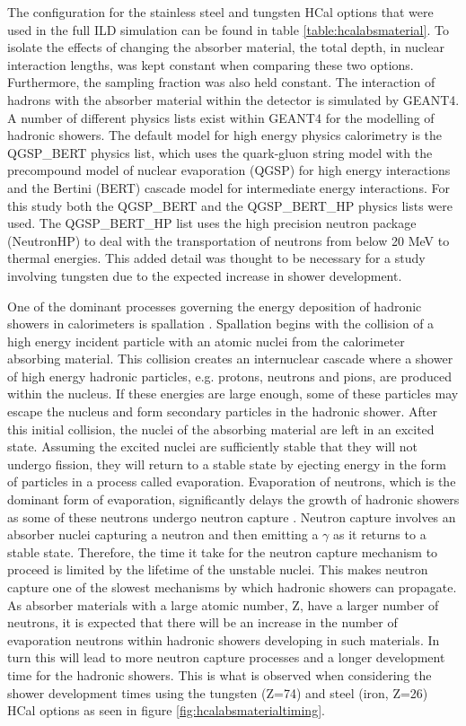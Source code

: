 The configuration for the stainless steel and tungsten HCal options that were used in the full ILD simulation can be found in table \ref{table:hcalabsmaterial}.  To isolate the effects of changing the absorber material, the total depth, in nuclear interaction lengths, was kept constant when comparing these two options.  Furthermore, the sampling fraction was also held constant.  The interaction of hadrons with the absorber material within the detector is simulated by GEANT4.  A number of different physics lists exist within GEANT4 for the modelling of hadronic showers.  The default model for high energy physics calorimetry is the QGSP\_BERT physics list, which uses the quark-gluon string model \cite{Folger:2003sb} with the precompound model of nuclear evaporation \cite{geantStringModel} (QGSP) for high energy interactions and the Bertini (BERT) cascade model \cite{Guthrie:1968ue} for intermediate energy interactions.  For this study both the QGSP\_BERT and the QGSP\_BERT\_HP physics lists were used.  The QGSP\_BERT\_HP list uses the high precision neutron package (NeutronHP) to deal with the transportation of neutrons from below 20 MeV to thermal energies.  This added detail was thought to be necessary for a study involving tungsten due to the expected increase in shower development.    

One of the dominant processes governing the energy deposition of hadronic showers in calorimeters is spallation \cite{Wigmans:2000vf}.  Spallation begins with the collision of a high energy incident particle with an atomic nuclei from the calorimeter absorbing material.  This collision creates an internuclear cascade where a shower of high energy hadronic particles, e.g. protons, neutrons and pions, are produced within the nucleus.  If these energies are large enough, some of these particles may escape the nucleus and form secondary particles in the hadronic shower.  After this initial collision, the nuclei of the absorbing material are left in an excited state.  Assuming the excited nuclei are sufficiently stable that they will not undergo fission, they will return to a stable state by ejecting energy in the form of particles in a process called evaporation.  Evaporation of neutrons, which is the dominant form of evaporation, significantly delays the growth of hadronic showers as some of these neutrons undergo neutron capture \cite{Adloff:2014rya}.  Neutron capture involves an absorber nuclei capturing a neutron and then emitting a $\gamma$ as it returns to a stable state.  Therefore, the time it take for the neutron capture mechanism to proceed is limited by the lifetime of the unstable nuclei.  This makes neutron capture one of the slowest mechanisms by which hadronic showers can propagate.  As absorber materials with a large atomic number, Z, have a larger number of neutrons, it is expected that there will be an increase in the number of evaporation neutrons within hadronic showers developing in such materials.  In turn this will lead to more neutron capture processes and a longer development time for the hadronic showers.  This is what is observed when considering the shower development times using the tungsten (Z=74) and steel (iron, Z=26) HCal options as seen in figure \ref{fig:hcalabsmaterialtiming}. 

